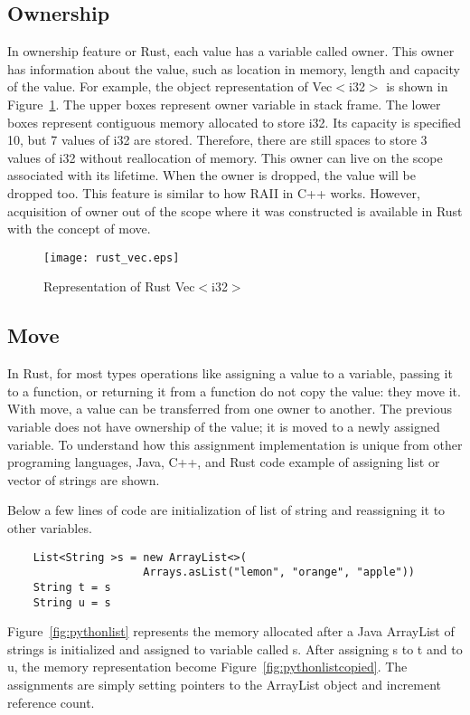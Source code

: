 \subsection{Ownership}
In ownership feature or Rust, each value has a variable called owner.
This owner has information about the value, such as location in memory, length and capacity of the value. 
For example, the object representation of Vec$<$i32$>$ is shown in Figure~\ref{fig:rustvec}. The upper boxes represent owner variable in stack frame. 
The lower boxes represent contiguous memory allocated to store i32. Its capacity is specified 10, but 7 values of i32 are stored. 
Therefore, there are still spaces to store 3 values of i32 without reallocation of memory. This owner can live on the scope associated with its lifetime.
When the owner is dropped, the value will be dropped too. This feature is similar to how RAII in C++ works. 
However, acquisition of owner out of the scope where it was constructed is available in Rust with the concept of move. 

\begin{figure}[htb]
    \texttt{[image: rust\_vec.eps]}
    \caption{Representation of Rust Vec$<$i32$>$}
    \label{fig:rustvec}
\end{figure}



\subsection{Move}
In Rust, for most types operations like assigning a value to a variable, passing it to a function, or returning it from a function do not copy the value: they move it. 
With move, a value can be transferred from one owner to another. The previous variable does not have ownership of the value; it is moved to a newly assigned variable. 
To understand how this assignment implementation is unique from other programing languages, Java, C++, and Rust code example of assigning list or vector of strings are shown.

Below a few lines of code are initialization of list of string and reassigning it to other variables. 
\begin{lstlisting}
    List<String >s = new ArrayList<>(
                     Arrays.asList("lemon", "orange", "apple"))
    String t = s
    String u = s
 \end{lstlisting}
Figure~\ref{fig:pythonlist} represents the memory allocated after a Java ArrayList of strings is initialized and assigned to variable called s. After assigning s to t and to u, 
the memory representation become Figure~\ref{fig:pythonlistcopied}. The assignments are simply setting pointers to the ArrayList object and increment reference count. 


